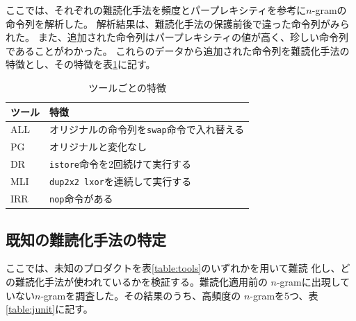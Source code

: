 \documentclass[a4j,fleqn,10pt]{jarticle}
\begin{document}


ここでは、それぞれの難読化手法を頻度とパープレキシティを参考に$n$-gramの命令列を解析した。
解析結果は、難読化手法の保護前後で違った命令列がみられた。
また、追加された命令列はパープレキシティの値が高く、珍しい命令列であることがわかった。
これらのデータから追加された命令列を難読化手法の特徴とし、その特徴を表\ref{table:features}に記す。

\begin{table}[t]
  \centering
  \footnotesize{
    \caption{ツールごとの特徴}\label{table:features}
  \begin{tabular}{l|l}
    ツール              & 特徴　\\ \hline
    ALL & オリジナルの命令列を\texttt{swap}命令で入れ替える \\
    PG  & オリジナルと変化なし \\
    DR  & \texttt{istore}命令を2回続けて実行する \\
    MLI & \texttt{dup2x2 lxor}を連続して実行する \\
    IRR & \texttt{nop}命令がある \\
  \end{tabular}}
\end{table}

\subsection{既知の難読化手法の特定}

ここでは、未知のプロダクトを表\ref{table:tools}のいずれかを用いて難読
化し、どの難読化手法が使われているかを検証する。難読化適用前の
$n$-gramに出現していない$n$-gramを調査した。その結果のうち、高頻度の
$n$-gramを5つ、表\ref{table:junit}に記す。
\end{document}
